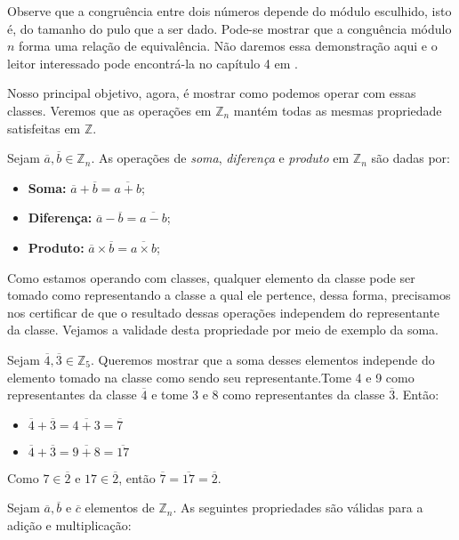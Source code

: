 Observe que a congru\^{e}ncia entre dois n\'{u}meros depende do m\'{o}dulo esculhido, isto \'{e}, do tamanho 
do pulo que a ser dado. Pode-se mostrar que a congu\^{e}ncia m\'{o}dulo $n$ forma uma rela\c{c}\~{a}o de 
equival\^{e}ncia. N\~{a}o daremos essa demonstra\c{c}\~{a}o aqui e o leitor interessado pode encontr\'{a}-la no 
cap\'{i}tulo 4 em \cite{cou:2014}.

Nosso principal objetivo, agora, \'{e} mostrar como podemos operar com essas classes. Veremos que as 
opera\c{c}\~{o}es em $\mathbb{Z}_{n}$ mant\'{e}m todas as mesmas propriedade satisfeitas em $\mathbb{Z}$.

\begin{Df}
Sejam $\overline{a},\overline{b}\in\mathbb{Z}_{n}$. As opera\c{c}\~{o}es de \textit{soma}, \textit{diferen\c{c}a} 
e \textit{produto} em $\mathbb{Z}_{n}$ s\~{a}o dadas por:
	\begin{itemize}
			\item \textbf{Soma:} $\overline{a}+\overline{b}=\overline{a+b}$;
			\item \textbf{Diferen\c{c}a:} $\overline{a}-\overline{b}=\overline{a-b}$;
			\item \textbf{Produto:} $\overline{a}\times\overline{b}=\overline{a\times b}$;
	\end{itemize}
\end{Df}

Como estamos operando com classes, qualquer elemento da classe pode ser tomado como representando 
a classe a qual ele pertence, dessa forma, precisamos nos certificar de que o resultado dessas opera\c{c}\~{o}es 
independem do representante da classe. Vejamos a validade desta propriedade por meio de exemplo da soma.

Sejam $\overline{4},\overline{3}\in\mathbb{Z}_{5}$. Queremos mostrar que a soma desses elementos independe do 
elemento tomado na classe como sendo seu representante.Tome 4 e 9 como representantes da classe $\overline{4}$ e
tome 3 e 8 como representantes da classe $\overline{3}$. Ent\~{a}o:
				\begin{itemize}
					\item $\overline{4}+\overline{3}=\overline{4+3}=\overline{7}$
					\item $\overline{4}+\overline{3}=\overline{9+8}=\overline{17}$ 
				\end{itemize}
Como $7\in\overline{2}$ e $17\in\overline{2}$, ent\~{a}o $\overline{7}=\overline{17}=\overline{2}$.

Sejam $\overline{a}, \overline{b}$ e $\overline{c}$ elementos de $\mathbb{Z}_{n}$. 
As seguintes propriedades s\~{a}o v\'{a}lidas para a adi\c{c}\~{a}o e multiplica\c{c}\~{a}o:


